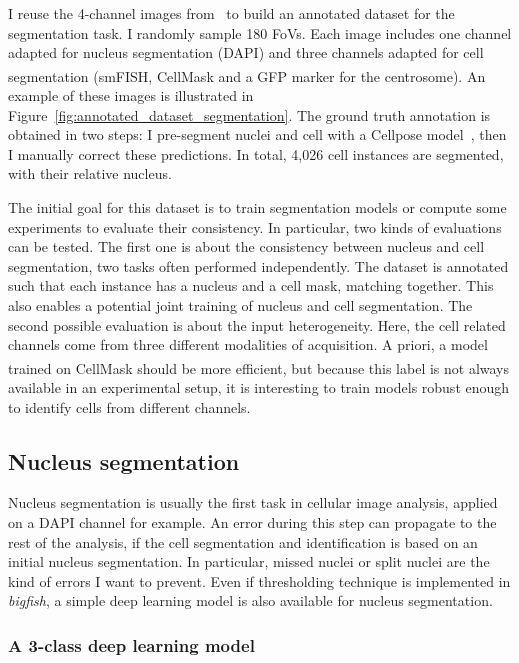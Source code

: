I reuse the 4-channel images from~\cite{safieddine_choreography_2021} to build an annotated dataset for the segmentation task.
I randomly sample 180 \ac{FoV}s.
Each image includes one channel adapted for nucleus segmentation (DAPI) and three channels adapted for cell segmentation (\ac{smFISH}, CellMask\textsuperscript{\texttrademark} and a \ac{GFP} marker for the centrosome).
An example of these images is illustrated in Figure~\ref{fig:annotated_dataset_segmentation}.
The ground truth annotation is obtained in two steps: I pre-segment nuclei and cell with a Cellpose model~\cite{stringer_cellpose_2021}, then I manually correct these predictions.
In total, 4,026 cell instances are segmented, with their relative nucleus.

The initial goal for this dataset is to train segmentation models or compute some experiments to evaluate their consistency.
In particular, two kinds of evaluations can be tested.
The first one is about the consistency between nucleus and cell segmentation, two tasks often performed independently.
The dataset is annotated such that each instance has a nucleus and a cell mask, matching together.
This also enables a potential joint training of nucleus and cell segmentation.
The second possible evaluation is about the input heterogeneity.
Here, the cell related channels come from three different modalities of acquisition.
A priori, a model trained on CellMask\textsuperscript{\texttrademark} should be more efficient, but because this label is not always available in an experimental setup, it is interesting to train models robust enough to identify cells from different channels.

\subsection{Nucleus segmentation}
\label{subsec:segmentation_nuc}

Nucleus segmentation is usually the first task in cellular image analysis, applied on a DAPI channel for example.
An error during this step can propagate to the rest of the analysis, if the cell segmentation and identification is based on an initial nucleus segmentation.
In particular, missed nuclei or split nuclei are the kind of errors I want to prevent.
Even if thresholding technique is implemented in \emph{bigfish}, a simple deep learning model is also available for nucleus segmentation.

\subsubsection{A 3-class deep learning model}

